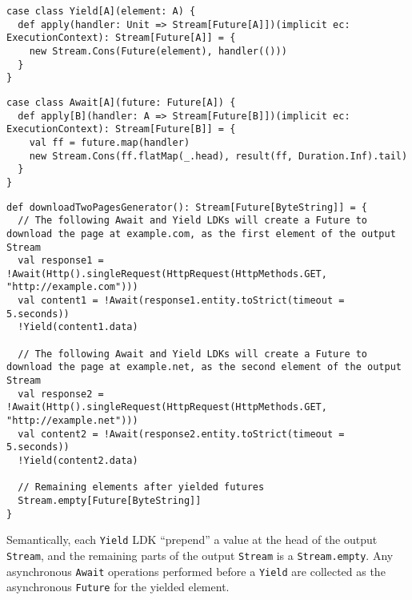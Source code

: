 \begin{lstlisting}[caption={Implementing modified version of \lstinline{Yield} LDK for creating asynchronous generators},label={Yield-StreamFuture}]
case class Yield[A](element: A) {
  def apply(handler: Unit => Stream[Future[A]])(implicit ec: ExecutionContext): Stream[Future[A]] = {
    new Stream.Cons(Future(element), handler(()))
  }
}
\end{lstlisting}

\begin{lstlisting}[caption={Implementing a modified version of \lstinline{Await} LDK for creating asynchronous generators},label={Await-StreamFuture}]
case class Await[A](future: Future[A]) {
  def apply[B](handler: A => Stream[Future[B]])(implicit ec: ExecutionContext): Stream[Future[B]] = {
    val ff = future.map(handler)
    new Stream.Cons(ff.flatMap(_.head), result(ff, Duration.Inf).tail)
  }
}
\end{lstlisting}
  

\begin{lstlisting}[caption={Downloading two web pages as an asynchronous generator, in the style of !-notation},label={downloadTwoPages-StreamFuture}]
def downloadTwoPagesGenerator(): Stream[Future[ByteString]] = {
  // The following Await and Yield LDKs will create a Future to download the page at example.com, as the first element of the output Stream
  val response1 = !Await(Http().singleRequest(HttpRequest(HttpMethods.GET, "http://example.com")))
  val content1 = !Await(response1.entity.toStrict(timeout = 5.seconds))
  !Yield(content1.data)

  // The following Await and Yield LDKs will create a Future to download the page at example.net, as the second element of the output Stream
  val response2 = !Await(Http().singleRequest(HttpRequest(HttpMethods.GET, "http://example.net")))
  val content2 = !Await(response2.entity.toStrict(timeout = 5.seconds))
  !Yield(content2.data)

  // Remaining elements after yielded futures
  Stream.empty[Future[ByteString]]
}
\end{lstlisting}

Semantically, each \lstinline{Yield} LDK ``prepend'' a value at the head of the output \lstinline{Stream}, and the remaining parts of the output \lstinline{Stream} is a \lstinline{Stream.empty}. Any asynchronous \lstinline{Await} operations performed before a \lstinline{Yield} are collected as the asynchronous \lstinline{Future} for the yielded element.

